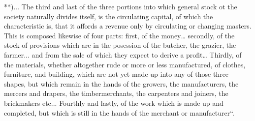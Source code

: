 **)... The third and last of the three portions into which general stock ot the
society naturally divides itself, is the circulating capital, of which the characteristic
is, that it affords a revenue only by circulating or changing masters. This is
composed likewise of four parts: first, of the money… secondly, of the stock of
provisions which are in the posession of the butcher, the grazier, the farmer... and
from the sale of which they expect to derive a profit… Thirdly, of the materials,
whether altogether rude or more or less manufactured, of clothes, furniture, and
building, which are not yet made up into any of those three shapes, but which remain
in the hands of the growers, the manufacturers, the mercers and drapers, the timbermerchants, the
carpenters and joiners, the brickmakers etc... Fourthly and lastly, of
the work which is made up and completed, but which is still in the hands of the
merchant or manufacturer“.
